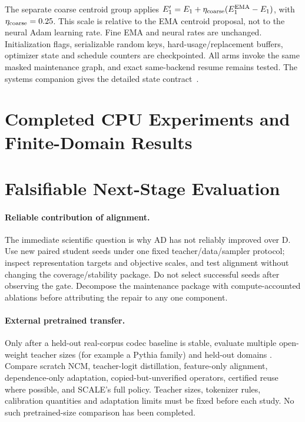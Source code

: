 \documentclass[11pt,a4paper]{article}
\begin{document}
The separate coarse centroid group applies
\(E'_1=E_1+\eta_{\rm coarse}(E_1^{\rm EMA}-E_1)\), with
\(\eta_{\rm coarse}=0.25\). This scale is relative to the EMA centroid proposal,
not to the neural Adam learning rate. Fine EMA and neural rates are unchanged.
Initialization flags, serializable random keys, hard-usage/replacement buffers,
optimizer state and schedule counters are checkpointed. All arms invoke the
same masked maintenance graph, and exact same-backend resume remains tested.
The systems companion gives the detailed state contract~\citep{systemscompanion}.

\section{Completed CPU Experiments and Finite-Domain Results}
\label{sec:experiments}


\section{Falsifiable Next-Stage Evaluation}
\paragraph{Reliable contribution of alignment.}
The immediate scientific question is why AD has not reliably improved over D.
Use new paired student seeds under one fixed teacher/data/sampler protocol;
inspect representation targets and objective scales, and test alignment without
changing the coverage/stability package. Do not select successful seeds after
observing the gate. Decompose the maintenance package with compute-accounted
ablations before attributing the repair to any one component.

\paragraph{External pretrained transfer.}
Only after a held-out real-corpus codec baseline is stable, evaluate multiple
open-weight teacher sizes (for example a Pythia family) and held-out domains
\citep{biderman2023}. Compare scratch NCM, teacher-logit distillation, feature-only
alignment, dependence-only adaptation, copied-but-unverified operators, certified
reuse where possible, and SCALE's full policy. Teacher sizes, tokenizer rules,
calibration quantities and adaptation limits must be fixed before each study.
No such pretrained-size comparison has been completed.
\end{document}

